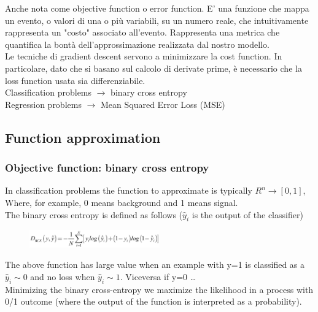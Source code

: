 \begin{tcolorbox}[width=\textwidth,colback={white},title={\textbf{19:} What is a loss function? Which properties should it have in order to be used in a gradient descent technique? Which loss functions are more appropriate for classification vs regression problems?},colbacktitle=red,coltitle=black]
	
Anche nota come objective function o error function. E’ una funzione che mappa un evento, o valori di una o più variabili, su un numero reale, che intuitivamente rappresenta un "costo" associato all'evento. Rappresenta una metrica che quantifica la bontà dell’approssimazione realizzata dal nostro modello.\\

Le tecniche di gradient descent servono a minimizzare la cost function. In particolare, dato che si basano sul calcolo di derivate prime, è necessario che la loss function usata sia differenziabile.\\

Classification problems $\rightarrow$ binary cross entropy\\
Regression problems  $\rightarrow$ Mean Squared Error Loss (MSE)\\

\end{tcolorbox}

\subsection{Function approximation}

\subsubsection{Objective function: binary cross entropy}
In classification problems the function to approximate is typically $R^n \rightarrow [0,1]$, Where, for example, 0 means background and 1 means signal.\\
The binary cross entropy is defined as follows ($\hat{y}_i$ is the output of the classifier)

\begin{figure}[h]
	\centering
	\includegraphics[width=0.5\textwidth]{figure_ml/D_bce.png}
\end{figure}
\FloatBarrier
The above function has large value when an example with y=1 is classified as 
a  $\hat{y}_i \sim 0$ and no loss when $\hat{y}_i \sim 1$. Viceversa if y=0 …\\
Minimizing the binary cross-entropy we maximize the likelihood in a process with 0/1 outcome (where the output of the function is interpreted as a probability).

